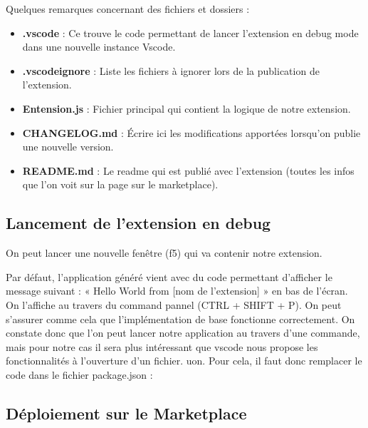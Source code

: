 \documentclass[
    iict, %
    il, %
]{heig-tb}
\begin{document}
Quelques remarques concernant des fichiers et dossiers :
\begin{itemize}
    \item \textbf{.vscode} : Ce trouve le code permettant de lancer l’extension en debug mode dans une nouvelle instance Vscode.
    \item \textbf{.vscodeignore} : Liste les fichiers à ignorer lors de la publication de l’extension.
    \item \textbf{Entension.js} : Fichier principal qui contient la logique de notre extension.
    \item \textbf{CHANGELOG.md} : Écrire ici les modifications apportées lorsqu’on publie une nouvelle version.
    \item \textbf{README.md} : Le readme qui est publié avec l’extension (toutes les infos que l’on voit sur la page sur le marketplace).
\end{itemize}

\subsection{Lancement de l’extension en debug}
On peut lancer une nouvelle fenêtre (f5) qui va contenir notre extension.

Par défaut, l’application généré vient avec du code permettant d’afficher le message suivant : « Hello World from [nom de l’extension] » en bas de l’écran. On l’affiche au travers du command pannel (CTRL + SHIFT + P). On peut s’assurer comme cela que l’implémentation de base fonctionne correctement.
On constate donc que l’on peut lancer notre application au travers d’une commande, mais pour notre cas il sera plus intéressant que vscode nous propose les fonctionnalités à l’ouverture d’un fichier. uon.
Pour cela, il faut donc remplacer le code dans le fichier package.json :

\subsection{Déploiement sur le Marketplace}
\end{document}
